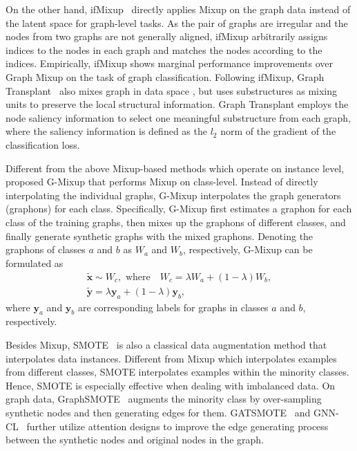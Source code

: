 \documentclass[11pt]{article}
\begin{document}
On the other hand, ifMixup~\cite{guo2021intrusion} directly applies Mixup on the graph data instead of the latent space for graph-level tasks. As the pair of graphs are irregular and the nodes from two graphs are not generally aligned, ifMixup arbitrarily assigns indices to the nodes in each graph and matches the nodes according to the indices. 
Empirically, ifMixup shows marginal performance improvements over Graph Mixup on the task of graph classification.
Following ifMixup, Graph Transplant~\cite{park2021graph} also mixes graph in data space
, but uses substructures as mixing units to preserve the local structural information. Graph Transplant employs the node saliency information to select one meaningful substructure from each graph, where the saliency information is defined as the $l_2$ norm of the gradient of the classification loss. 

Different from the above Mixup-based methods which operate on instance level, \citet{han2022G} proposed G-Mixup that performs Mixup on class-level. Instead of directly interpolating the individual graphs, G-Mixup interpolates the graph generators (graphons) for each class. Specifically, G-Mixup first estimates a graphon for each class of the training graphs, then mixes up the graphons of different classes, and finally generate synthetic graphs with the mixed graphons. Denoting the graphons of classes $a$ and $b$ as $W_a$ and $W_b$, respectively, G-Mixup can be formulated as
\begin{equation}
    \begin{array}{cc}
         \tilde{\boldsymbol{x}} \sim W_c, \text{ where}\quad W_c = \lambda W_a + (1-\lambda)W_b, \\
         \tilde{\boldsymbol{y}} = \lambda\boldsymbol{y}_a + (1-\lambda)\boldsymbol{y}_b,
    \end{array}
\end{equation}
where $\boldsymbol{y}_a$ and $\boldsymbol{y}_b$ are corresponding labels for graphs in classes $a$ and $b$, respectively.

Besides Mixup, SMOTE~\cite{chawla2002smote} is also a classical data augmentation method that interpolates data instances. Different from Mixup which interpolates examples from different classes, SMOTE interpolates examples within the minority classes. Hence, SMOTE is especially effective when dealing with imbalanced data. On graph data, GraphSMOTE~\cite{zhao2021graphsmote} augments the minority class by over-sampling synthetic nodes and then generating edges for them. GATSMOTE~\cite{liu2022gatsmote} and GNN-CL~\cite{li2022graph} further utilize attention designs to improve the edge generating process between the synthetic nodes and original nodes in the graph.
\end{document}

